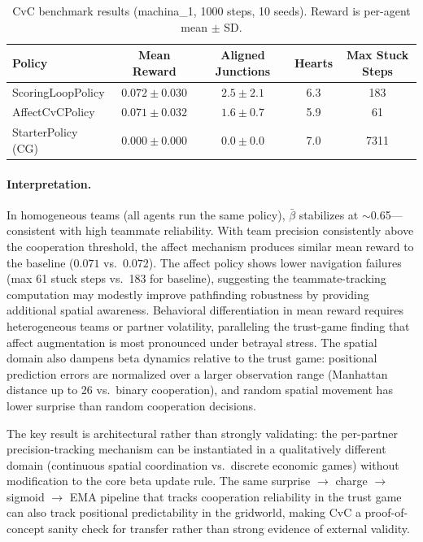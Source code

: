 \documentclass[11pt,a4paper]{article}
\begin{document}
\begin{table}[ht]
\centering
\caption{CvC benchmark results (machina\_1, 1000 steps, 10 seeds). Reward is per-agent mean $\pm$ SD.}
\label{tab:cvc}
\begin{tabular}{lcccc}
\toprule
Policy & Mean Reward & Aligned Junctions & Hearts & Max Stuck Steps \\
\midrule
ScoringLoopPolicy   & $0.072 \pm 0.030$ & $2.5 \pm 2.1$ & 6.3 & 183 \\
AffectCvCPolicy     & $0.071 \pm 0.032$ & $1.6 \pm 0.7$ & 5.9 &  61 \\
StarterPolicy (CG)  & $0.000 \pm 0.000$ & $0.0 \pm 0.0$ & 7.0 & 7311 \\
\bottomrule
\end{tabular}
\end{table}

\paragraph{Interpretation.} In homogeneous teams (all agents run the same policy), $\bar{\beta}$ stabilizes at $\sim$0.65---consistent with high teammate reliability. With team precision consistently above the cooperation threshold, the affect mechanism produces similar mean reward to the baseline ($0.071$ vs.\ $0.072$). The affect policy shows lower navigation failures (max 61 stuck steps vs.\ 183 for baseline), suggesting the teammate-tracking computation may modestly improve pathfinding robustness by providing additional spatial awareness. Behavioral differentiation in mean reward requires heterogeneous teams or partner volatility, paralleling the trust-game finding that affect augmentation is most pronounced under betrayal stress. The spatial domain also dampens beta dynamics relative to the trust game: positional prediction errors are normalized over a larger observation range (Manhattan distance up to 26 vs.\ binary cooperation), and random spatial movement has lower surprise than random cooperation decisions.

The key result is architectural rather than strongly validating: the per-partner precision-tracking mechanism can be instantiated in a qualitatively different domain (continuous spatial coordination vs.\ discrete economic games) without modification to the core beta update rule. The same surprise $\to$ charge $\to$ sigmoid $\to$ EMA pipeline that tracks cooperation reliability in the trust game can also track positional predictability in the gridworld, making CvC a proof-of-concept sanity check for transfer rather than strong evidence of external validity.
\end{document}
